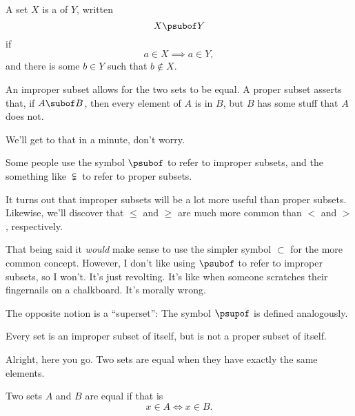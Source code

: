 \begin{definition}
  A set $X$ is a  of $Y$, written $$X \psubof Y$$
  if
  $$a \in X \implies a \in Y,$$ and there is some $b \in Y$ such that
  $b \notin X$.
\end{definition}



An improper subset allows for the two sets to be equal. A proper
subset asserts that, if $A \subof B$, then every element of $A$ is in
$B$, but $B$ has some stuff that $A$ does not.


We'll get to that in a minute, don't worry.

\begin{remark}
  Some people use the symbol $\psubof$ to refer to improper subsets,
  and the something like $\subsetneqq$ to refer to proper subsets.

  It turns out that improper subsets will be a lot more useful than
  proper subsets. Likewise, we'll discover that $\le$ and $\ge$ are
  much more common than $<$ and $>$, respectively.

  That being said it \emph{would} make sense to use the simpler symbol
  $\subset$ for the more common concept.  However, I don't like using
  $\psubof$ to refer to improper subsets, so I won't. It's just
  revolting. It's like when someone scratches their fingernails on a
  chalkboard. It's morally wrong.
\end{remark}

The opposite notion is a ``superset'':  The symbol $\psupof$ is defined analogously.

\begin{lemma}
  Every set is an improper subset of itself, but is not a proper
  subset of itself.
\end{lemma}


Alright, here you go. Two sets are equal when they have exactly the
same elements.

\begin{definition}
  Two sets $A$ and $B$ are equal if  that is $$x \in A \iff x \in B.$$
\end{definition}

